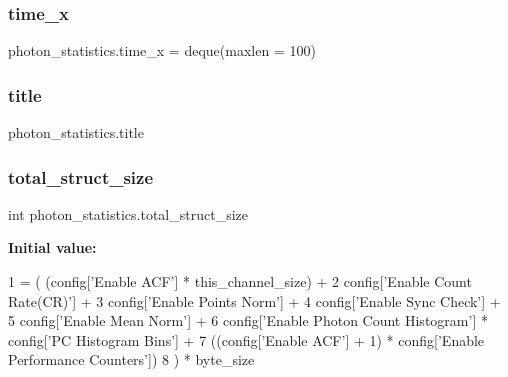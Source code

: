 \mbox{\label{namespacephoton__statistics_a718548ec119098f106f9ff9f31b409bf}} 
\subsubsection{\texorpdfstring{time\+\_\+x}{time\_x}}
{\footnotesize\ttfamily photon\+\_\+statistics.\+time\+\_\+x = deque(maxlen = 100)}

\mbox{\label{namespacephoton__statistics_a76d9f47b30df749d7d370e77849ca649}} 
\subsubsection{\texorpdfstring{title}{title}}
{\footnotesize\ttfamily photon\+\_\+statistics.\+title}

\mbox{\label{namespacephoton__statistics_aa8b4fc62029e126fa660593daaa282f8}} 
\subsubsection{\texorpdfstring{total\+\_\+struct\+\_\+size}{total\_struct\_size}}
{\footnotesize\ttfamily int photon\+\_\+statistics.\+total\+\_\+struct\+\_\+size}

{\bfseries Initial value\+:}
\begin{DoxyCode}
1 =  (    (config[\textcolor{stringliteral}{'Enable ACF'}] * this\_channel\_size) + 
2                             config[\textcolor{stringliteral}{'Enable Count Rate(CR)'}] +
3                             config[\textcolor{stringliteral}{'Enable Points Norm'}] +
4                             config[\textcolor{stringliteral}{'Enable Sync Check'}] +
5                             config[\textcolor{stringliteral}{'Enable Mean Norm'}] + 
6                             config[\textcolor{stringliteral}{'Enable Photon Count Histogram'}] * config[\textcolor{stringliteral}{'PC Histogram Bins'}] +
7                             ((config[\textcolor{stringliteral}{'Enable ACF'}] + 1) * config[\textcolor{stringliteral}{'Enable Performance Counters'}])
8                         ) * byte\_size
\end{DoxyCode}
\mbox{\label{namespacephoton__statistics_aa0ea01ea8f5c4844ed6c10dbe51d0497}} 
